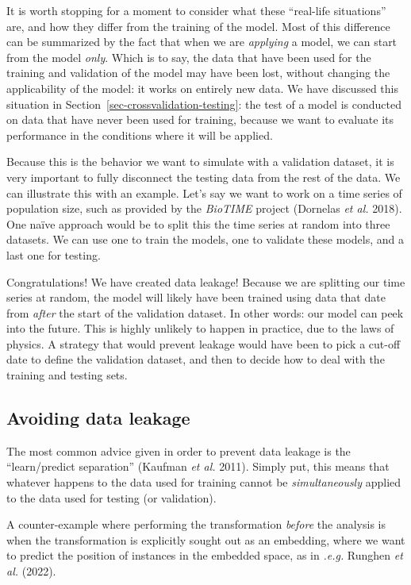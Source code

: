 \documentclass[
  letterpaper,
]{scrbook}
\begin{document}
It is worth stopping for a moment to consider what these ``real-life
situations'' are, and how they differ from the training of the model.
Most of this difference can be summarized by the fact that when we are
\emph{applying} a model, we can start from the model \emph{only}. Which
is to say, the data that have been used for the training and validation
of the model may have been lost, without changing the applicability of
the model: it works on entirely new data. We have discussed this
situation in Section~\ref{sec-crossvalidation-testing}: the test of a
model is conducted on data that have never been used for training,
because we want to evaluate its performance in the conditions where it
will be applied.

Because this is the behavior we want to simulate with a validation
dataset, it is very important to fully disconnect the testing data from
the rest of the data. We can illustrate this with an example. Let's say
we want to work on a time series of population size, such as provided by
the \emph{BioTIME} project (Dornelas \emph{et al.} 2018). One naïve
approach would be to split this the time series at random into three
datasets. We can use one to train the models, one to validate these
models, and a last one for testing.

Congratulations! We have created data leakage! Because we are splitting
our time series at random, the model will likely have been trained using
data that date from \emph{after} the start of the validation dataset. In
other words: our model can peek into the future. This is highly unlikely
to happen in practice, due to the laws of physics. A strategy that would
prevent leakage would have been to pick a cut-off date to define the
validation dataset, and then to decide how to deal with the training and
testing sets.

\subsection{Avoiding data leakage}\label{sec-leakage-avoid}

The most common advice given in order to prevent data leakage is the
``learn/predict separation'' (Kaufman \emph{et al.} 2011). Simply put,
this means that whatever happens to the data used for training cannot be
\emph{simultaneously} applied to the data used for testing (or
validation).

A counter-example where performing the transformation \emph{before} the
analysis is when the transformation is explicitly sought out as an
embedding, where we want to predict the position of instances in the
embedded space, as in \emph{.e.g.} Runghen \emph{et al.} (2022).
\end{document}
